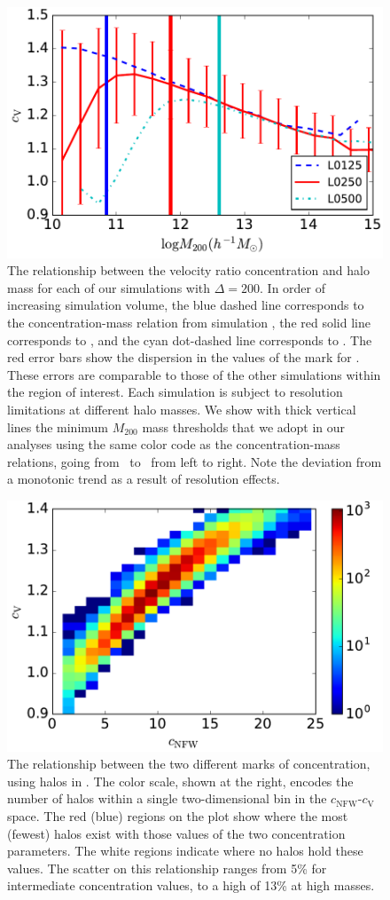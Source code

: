 \documentclass[usenatbib]{mnras}
\begin{document}
\begin{figure}
\centering
\includegraphics[width=.5\textwidth]{masscut_cV_d200.pdf}
\caption{The relationship between the velocity ratio concentration and halo mass for each of our simulations with $\Delta =200$. 
In order of increasing simulation volume, the blue dashed line corresponds to the concentration-mass relation from simulation 
\simA, the red solid line corresponds to \simB, and the cyan dot-dashed line corresponds to \simC. The red error bars show the
dispersion in the values of the mark for \simB. These errors are comparable to those of the other simulations
within the region of interest.
Each simulation is subject to resolution limitations at different halo masses. We show with thick vertical lines 
the minimum $M_{200}$ mass thresholds that we adopt in our analyses using the same color code as 
the concentration-mass relations, going from \simA \ to \simC \ from left to right. Note the deviation from a monotonic trend as a result of resolution effects.
}
\label{fig:cvrelation}
\end{figure}

\begin{figure}
\centering
\includegraphics[width=.5\textwidth]{cvvscnfw_relation.pdf}
\caption{
The relationship between the two different marks of concentration, 
using halos in \simB. The color scale, shown at the right, encodes the number of halos 
within a single two-dimensional bin in the $c_{\mathrm{NFW}}$-$c_{\mathrm{V}}$ space. 
The red (blue) regions on the plot show where the most (fewest) halos exist with those values of the two
concentration parameters. The white regions indicate where no halos hold these values. The scatter on this relationship ranges from 5\% for intermediate concentration values, to a high of 13\% at high masses.
}
\label{fig:concentrations}
\end{figure}
\end{document}
